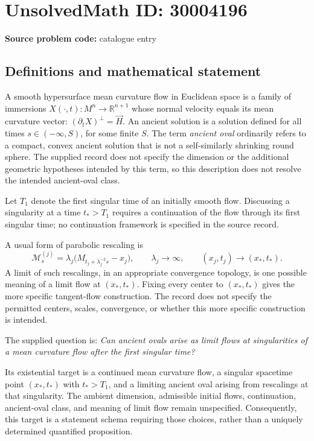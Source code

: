 \documentclass[11pt]{article}
\newcommand{\R}{\mathbb{R}}
\begin{document}
\section*{UnsolvedMath ID: 30004196}
\textbf{Source problem code:} catalogue entry
\subsection{Definitions and mathematical statement}
A smooth hypersurface mean curvature flow in Euclidean space is a family of immersions \(X(\cdot,t):M^n\to\R^{n+1}\) whose normal velocity equals its mean curvature vector: \((\partial_tX)^\perp=\vec H\). An ancient solution is a solution defined for all times \(s\in(-\infty,S)\), for some finite \(S\). The term \emph{ancient oval} ordinarily refers to a compact, convex ancient solution that is not a self-similarly shrinking round sphere. The supplied record does not specify the dimension or the additional geometric hypotheses intended by this term, so this description does not resolve the intended ancient-oval class.

Let \(T_1\) denote the first singular time of an initially smooth flow. Discussing a singularity at a time \(t_*>T_1\) requires a continuation of the flow through its first singular time; no continuation framework is specified in the source record.

A usual form of parabolic rescaling is
\[
\mathcal M^{(j)}_s
=\lambda_j\bigl(M_{t_j+\lambda_j^{-2}s}-x_j\bigr),
\qquad \lambda_j\to\infty,
\qquad (x_j,t_j)\to(x_*,t_*).
\]
A limit of such rescalings, in an appropriate convergence topology, is one possible meaning of a limit flow at \((x_*,t_*)\). Fixing every center to \((x_*,t_*)\) gives the more specific tangent-flow construction. The record does not specify the permitted centers, scales, convergence, or whether this more specific construction is intended.

The supplied question is: \emph{Can ancient ovals arise as limit flows at singularities of a mean curvature flow after the first singular time?}

Its existential target is a continued mean curvature flow, a singular spacetime point \((x_*,t_*)\) with \(t_*>T_1\), and a limiting ancient oval arising from rescalings at that singularity. The ambient dimension, admissible initial flows, continuation, ancient-oval class, and meaning of limit flow remain unspecified. Consequently, this target is a statement schema requiring those choices, rather than a uniquely determined quantified proposition.
\end{document}
